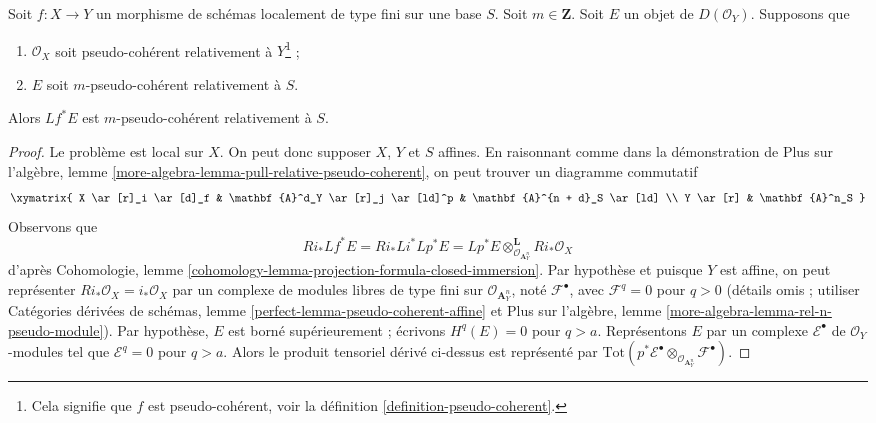 \begin{lemma}
\label{lemma-pull-relative-pseudo-coherent}
Soit $f : X \to Y$ un morphisme de schémas localement de type fini
sur une base $S$. Soit $m \in \mathbf{Z}$. Soit $E$ un objet de
$D(\mathcal{O}_Y)$. Supposons que
\begin{enumerate}
\item $\mathcal{O}_X$ soit pseudo-cohérent relativement à $Y$\footnote{Cela
signifie que $f$ est pseudo-cohérent, voir la
définition \ref{definition-pseudo-coherent}.} ;
\item $E$ soit $m$-pseudo-cohérent relativement à $S$.
\end{enumerate}
Alors $Lf^*E$ est $m$-pseudo-cohérent relativement à $S$.
\end{lemma}

\begin{proof}
Le problème est local sur $X$. On peut donc supposer $X$, $Y$ et $S$ affines.
En raisonnant comme dans la démonstration de Plus sur l'algèbre, lemme
\ref{more-algebra-lemma-pull-relative-pseudo-coherent},
on peut trouver un diagramme commutatif
$$
\xymatrix{
X \ar[r]_i \ar[d]_f &
\mathbf{A}^d_Y \ar[r]_j \ar[ld]^p &
\mathbf{A}^{n + d}_S \ar[ld] \\
Y \ar[r] &
\mathbf{A}^n_S
}
$$
Observons que
$$
Ri_* Lf^*E = Ri_* Li^* Lp^*E =
Lp^*E \otimes_{\mathcal{O}_{\mathbf{A}_Y^n}}^\mathbf{L} Ri_*\mathcal{O}_X
$$
d'après Cohomologie, lemme
\ref{cohomology-lemma-projection-formula-closed-immersion}.
Par hypothèse et puisque $Y$ est affine, on peut représenter
$Ri_*\mathcal{O}_X = i_*\mathcal{O}_X$ par un complexe de modules libres de type fini
sur $\mathcal{O}_{\mathbf{A}_Y^n}$, noté $\mathcal{F}^\bullet$, avec
$\mathcal{F}^q = 0$ pour $q > 0$
(détails omis ; utiliser Catégories dérivées de schémas, lemme
\ref{perfect-lemma-pseudo-coherent-affine}
et
Plus sur l'algèbre, lemme
\ref{more-algebra-lemma-rel-n-pseudo-module}).
Par hypothèse, $E$ est borné supérieurement ; écrivons $H^q(E) = 0$ pour $q > a$.
Représentons $E$ par un complexe $\mathcal{E}^\bullet$ de $\mathcal{O}_Y$-modules
tel que $\mathcal{E}^q = 0$ pour $q > a$. Alors le produit tensoriel dérivé ci-dessus
est représenté par $\text{Tot}(p^*\mathcal{E}^\bullet
\otimes_{\mathcal{O}_{\mathbf{A}_Y^n}} \mathcal{F}^\bullet)$.


\end{proof}
